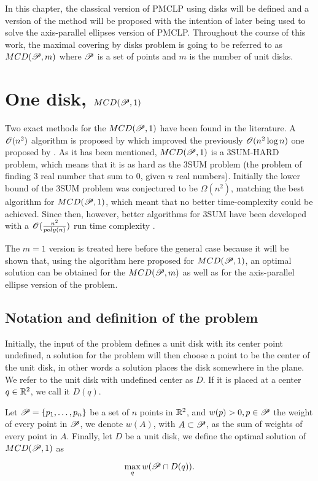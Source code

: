 In this chapter, the classical version of PMCLP using disks will be defined and a version of the method will be proposed with the intention of later being used to solve the axis-parallel ellipses version of PMCLP. Throughout the course of this work, the maximal covering by disks problem is going to be referred to as $MCD(\mathscr{P},m)$ where $\mathscr{P}$ is a set of points and $m$ is the number of unit disks.

\section{One disk, $MCD(\mathscr{P},1)$}


Two exact methods for the $MCD(\mathscr{P}, 1)$ have been found in the literature. A $\mathscr{O}(n^2)$ algorithm is proposed by \cite{chazelle:1986} which improved the previously $\mathscr{O}(n^2\log{n})$ one proposed by \cite{drezner}.
As it has been mentioned, $MCD(\mathscr{P},1)$ is a 3SUM-HARD problem, which means that it is as hard as the 3SUM problem (the problem of finding $3$ real number that sum to $0$, given $n$ real numbers). Initially the lower bound of the 3SUM problem was conjectured to be $\Omega(n^2)$, matching the best algorithm for $MCD(\mathscr{P},1)$, which meant that no better time-complexity could be achieved. Since then, however, better algorithms for 3SUM have been developed with a $\mathscr{O}(\frac{n^2}{poly(n)})$ run time complexity \cite{3SUM-kopelowitz:2014}.

The $m=1$ version is treated here before the general case because it will be shown that, using the algorithm here proposed for $MCD(\mathscr{P}, 1)$, an optimal solution can be obtained for the $MCD(\mathscr{P}, m)$ as well as for the axis-parallel ellipse version of the problem.

\subsection{Notation and definition of the problem}

Initially, the input of the problem defines a unit disk with its center point undefined, a solution for the problem will then choose a point to be the center of the unit disk, in other words a solution places the disk somewhere in the plane.
We refer to the unit disk with undefined center as $D$. If it is placed at a center $q \in \mathbb{R}^2$, we call it $D(q)$.

\begin{definicao}
    Let $\mathscr{P}=\{p_1,\dots,p_n\}$ be a set of $n$ points in $\mathbb{R}^2$, and $w(p)>0, p \in \mathscr{P}$ the weight of every point in $\mathscr{P}$, we denote $w(A)$, with $A \subset \mathscr{P}$, as the sum of weights of every point in $A$. Finally, let $D$ be a unit disk, we define the optimal solution of $MCD(\mathscr{P},1)$ as
    
    \begin{equation}\label{eq:max_one_disk}
        \max_q w(\mathscr{P} \cap D(q)).
    \end{equation}

\end{definicao}

